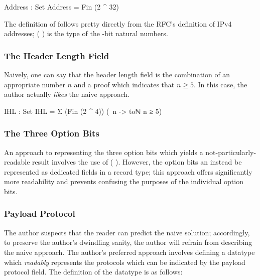 \documentclass{report}
\begin{document}
\begin{code}
  Address : Set
  Address = Fin (2 ^ 32)
\end{code}

The definition of  follows pretty directly from the RFC's definition of IPv4 addresses;  \AgdaSymbol( \AgdaOperator{\AgdaFunction{^}} \AgdaSymbol) is the type of the -bit natural numbers.

\subsubsection{The Header Length Field}
Naively, one can say that the header length field is the combination of an appropriate  number \(n\) and a proof which indicates that \(n \geq 5\).  In this case, the author actually \emph{likes} the naive approach.

\begin{code}
  IHL : Set
  IHL = Σ (Fin (2 ^ 4)) (\ n -> toℕ n ≥ 5)
\end{code}

\subsubsection{The Three Option Bits}
An approach to representing the three option bits which yields a not-particularly-readable result involves the use of  \AgdaSymbol( \AgdaOperator{\AgdaFunction{\circumflex}} \AgdaSymbol).  However, the option bits an instead be represented as dedicated  fields in a record type; this approach offers significantly more readability and prevents confusing the purposes of the individual option bits.

\subsubsection{Payload Protocol}
The author suspects that the reader can predict the naive solution; accordingly, to preserve the author's dwindling sanity, the author will refrain from describing the naive approach.  The author's preferred approach involves defining a datatype which \emph{readably} represents the protocols which can be indicated by the payload protocol field.  The definition of the datatype is as follows:
\end{document}

